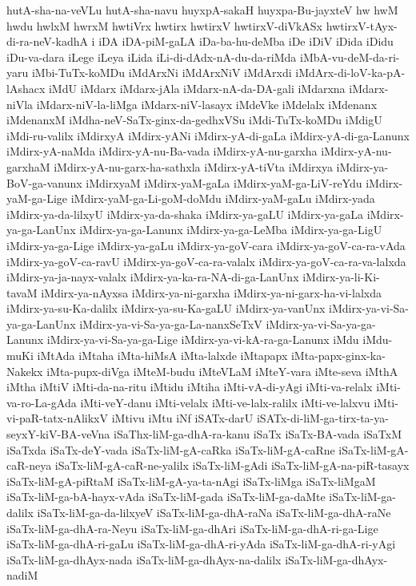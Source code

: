 {hutA-sha-na-veVLu
hutA-sha-navu
huyxpA-sakaH
huyxpa-Bu-jayxteV
hw
hwM
hwdu
hwlxM
hwrxM
hwtiVrx
hwtirx
hwtirxV
hwtirxV-diVkASx
hwtirxV-tAyx-di-ra-neV-kadhA
i
iDA
iDA-piM-gaLA
iDa-ba-hu-deMba
iDe
iDiV
iDida
iDidu
iDu-va-dara
iLege
iLeya
iLida
iLi-di-dAdx-nA-du-da-riMda
iMbA-vu-deM-da-ri-yaru
iMbi-TuTx-koMDu
iMdArxNi
iMdArxNiV
iMdArxdi
iMdArx-di-loV-ka-pA-lAshacx
iMdU
iMdarx
iMdarx-jAla
iMdarx-nA-da-DA-gali
iMdarxna
iMdarx-niVla
iMdarx-niV-la-liMga
iMdarx-niV-lasayx
iMdeVke
iMdelalx
iMdenanx
iMdenanxM
iMdha-neV-SaTx-ginx-da-gedhxVSu
iMdi-TuTx-koMDu
iMdigU
iMdi-ru-valilx
iMdirxyA
iMdirx-yANi
iMdirx-yA-di-gaLa
iMdirx-yA-di-ga-Lanunx
iMdirx-yA-naMda
iMdirx-yA-nu-Ba-vada
iMdirx-yA-nu-garxha
iMdirx-yA-nu-garxhaM
iMdirx-yA-nu-garx-ha-sathxla
iMdirx-yA-tiVta
iMdirxya
iMdirx-ya-BoV-ga-vanunx
iMdirxyaM
iMdirx-yaM-gaLa
iMdirx-yaM-ga-LiV-reYdu
iMdirx-yaM-ga-Lige
iMdirx-yaM-ga-Li-goM-doMdu
iMdirx-yaM-gaLu
iMdirx-yada
iMdirx-ya-da-lilxyU
iMdirx-ya-da-shaka
iMdirx-ya-gaLU
iMdirx-ya-gaLa
iMdirx-ya-ga-LanUnx
iMdirx-ya-ga-Lanunx
iMdirx-ya-ga-LeMba
iMdirx-ya-ga-LigU
iMdirx-ya-ga-Lige
iMdirx-ya-gaLu
iMdirx-ya-goV-cara
iMdirx-ya-goV-ca-ra-vAda
iMdirx-ya-goV-ca-ravU
iMdirx-ya-goV-ca-ra-valalx
iMdirx-ya-goV-ca-ra-va-lalxda
iMdirx-ya-ja-nayx-valalx
iMdirx-ya-ka-ra-NA-di-ga-LanUnx
iMdirx-ya-li-Ki-tavaM
iMdirx-ya-nAyxsa
iMdirx-ya-ni-garxha
iMdirx-ya-ni-garx-ha-vi-lalxda
iMdirx-ya-su-Ka-dalilx
iMdirx-ya-su-Ka-gaLU
iMdirx-ya-vanUnx
iMdirx-ya-vi-Sa-ya-ga-LanUnx
iMdirx-ya-vi-Sa-ya-ga-La-nanxSeTxV
iMdirx-ya-vi-Sa-ya-ga-Lanunx
iMdirx-ya-vi-Sa-ya-ga-Lige
iMdirx-ya-vi-kA-ra-ga-Lanunx
iMdu
iMdu-muKi
iMtAda
iMtaha
iMta-hiMsA
iMta-lalxde
iMtapapx
iMta-papx-ginx-ka-Nakekx
iMta-pupx-diVga
iMteM-budu
iMteVLaM
iMteY-vara
iMte-seva
iMthA
iMtha
iMtiV
iMti-da-na-ritu
iMtidu
iMtiha
iMti-vA-di-yAgi
iMti-va-relalx
iMti-va-ro-La-gAda
iMti-veY-danu
iMti-velalx
iMti-ve-lalx-ralilx
iMti-ve-lalxvu
iMti-vi-paR-tatx-nAlikxV
iMtivu
iMtu
iNf
iSATx-darU
iSATx-di-liM-ga-tirx-ta-ya-seyxY-kiV-BA-veVna
iSaThx-liM-ga-dhA-ra-kanu
iSaTx
iSaTx-BA-vada
iSaTxM
iSaTxda
iSaTx-deY-vada
iSaTx-liM-gA-caRka
iSaTx-liM-gA-caRne
iSaTx-liM-gA-caR-neya
iSaTx-liM-gA-caR-ne-yalilx
iSaTx-liM-gAdi
iSaTx-liM-gA-na-piR-tasayx
iSaTx-liM-gA-piRtaM
iSaTx-liM-gA-ya-ta-nAgi
iSaTx-liMga
iSaTx-liMgaM
iSaTx-liM-ga-bA-hayx-vAda
iSaTx-liM-gada
iSaTx-liM-ga-daMte
iSaTx-liM-ga-dalilx
iSaTx-liM-ga-da-lilxyeV
iSaTx-liM-ga-dhA-raNa
iSaTx-liM-ga-dhA-raNe
iSaTx-liM-ga-dhA-ra-Neyu
iSaTx-liM-ga-dhAri
iSaTx-liM-ga-dhA-ri-ga-Lige
iSaTx-liM-ga-dhA-ri-gaLu
iSaTx-liM-ga-dhA-ri-yAda
iSaTx-liM-ga-dhA-ri-yAgi
iSaTx-liM-ga-dhAyx-nada
iSaTx-liM-ga-dhAyx-na-dalilx
iSaTx-liM-ga-dhAyx-nadiM
}
